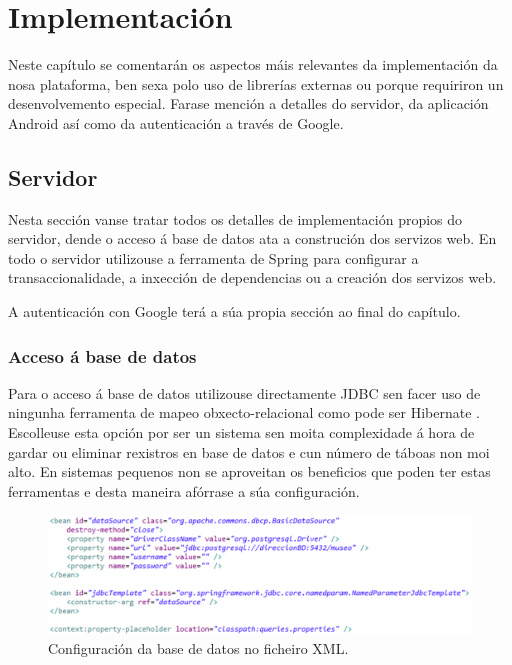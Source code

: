 \chapter{Implementación}

Neste capítulo se comentarán os aspectos máis relevantes da implementación da nosa plataforma, ben sexa polo uso de librerías externas ou porque requiriron un desenvolvemento especial. Farase mención a detalles do servidor, da aplicación Android así como da autenticación a través de Google.


\section{Servidor}
Nesta sección vanse tratar todos os detalles de implementación propios do servidor, dende o acceso á base de datos ata a construción dos servizos web. En todo o servidor utilizouse a ferramenta de Spring para configurar a transaccionalidade, a inxección de dependencias ou a creación dos servizos web.

A autenticación con Google terá a súa propia sección ao final do capítulo.


\subsection{Acceso á base de datos}
Para o acceso á base de datos utilizouse directamente JDBC sen facer uso de ningunha ferramenta de mapeo obxecto-relacional como pode ser Hibernate \cite{hibernate} \cite{hibernateLibro}. Escolleuse esta opción por ser un sistema sen moita complexidade á hora de gardar ou eliminar rexistros en base de datos e cun número de táboas non moi alto. En sistemas pequenos non se aproveitan os beneficios que poden ter estas ferramentas e desta maneira afórrase a súa configuración.

\begin{figure}[tbh] 
	\begin{center}
		\includegraphics[width=1\textwidth]{figures/codigo/configuracionBD}
		\caption{Configuración da base de datos no ficheiro XML.}
		\label{fig:configuracionBD}
	\end{center}
\end{figure}

